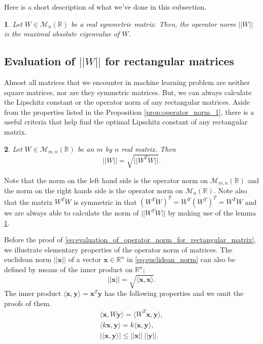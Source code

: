 \documentclass[12pt]{report}
\numberwithin{figure}{chapter}
\theoremstyle{plain}
\newtheorem{theorem}{\protect\theoremname}[chapter]
\theoremstyle{definition}
\theoremstyle{corollary}
\theoremstyle{definition}
\theoremstyle{plain}
\theoremstyle{definition}
\theoremstyle{plain}
\newtheorem{lemma}[theorem]{\protect\lemmaname}
\providecommand{\lemmaname}{Lemma}
\providecommand{\theoremname}{Theorem}
\newcommand\bx{\ensuremath{\boldsymbol x}}
\newcommand\by{\ensuremath{\boldsymbol y}}
\begin{document}
Here is a short description of what we've done in this subsection.
\begin{lemma}\label{lemm:evaluation_for_square_matrices}
Let \(W\in\mathcal M_n(\mathbb R)\) be a real symmetric matrix.
Then, the operator norm \(||W||\) is the maximal absolute eigenvalue of \(W\).
\end{lemma}

%
\subsection{Evaluation of \(||W||\) for rectangular matrices}
Almost all matrices that we encounter in machine learning problem are neither square matrices, nor are they symmetric matrices.
But, we can always calculate the Lipschitz constant or the operator norm of any rectangular matrices.
Aside from the properties listed in the Proposition \ref{prop:operator_norm_1}, there is a useful criteria that help find the optimal Lipschitz constant of any rectangular matrix.

\begin{theorem}\label{theo:evaluation_for_rectangular_matrices}
Let \(W\in\mathcal M_{m,n}(\mathbb R)\) be an \(m\) by \(n\) real matrix.
Then
\begin{equation}\label{eq:evaluation_of_operator_norm_for_rectangular_matrix}
||W||=\sqrt{||W^TW||}.
\end{equation}
\end{theorem}

Note that the norm on the left hand side is the operator norm on \(\mathcal M_{m,n}(\mathbb R)\) and the norm on the right hands side is the operator norm on \(\mathcal M_n(\mathbb R)\).
Note also that the matrix \(W^TW\) is symmetric in that \((W^TW)^T=W^T(W^T)^T=W^TW\) and we are always able to calculate the norm of \(||W^TW||\) by making use of the lemma \ref{lemm:evaluation_for_square_matrices}.

Before the proof of \eqref{eq:evaluation_of_operator_norm_for_rectangular_matrix}, we illustrate elementary properties of the operator norm of matrices.
The euclidean norm \(||\bx||\) of a vector \(\bx\in\mathbb R^n\) in \eqref{eq:euclidean_norm} can also be defined by means of the inner product on \(\mathbb R^n\);
\begin{equation}\label{eq:euclidean norm_2}
||\bx||=\sqrt{\langle \bx,\bx\rangle}.
\end{equation}
The inner product \(\langle \bx,\by\rangle=\bx^T\by\) has the following properties and we omit the proofs of them.
\begin{gather*}
\langle \bx,W\by\rangle=\langle W^T\bx,\by\rangle,\\
\langle k\bx,\by\rangle=k\langle \bx,\by\rangle,\\
|\langle\bx,\by\rangle|\le||\bx||\:||\by||.
\end{gather*}
\end{document}
